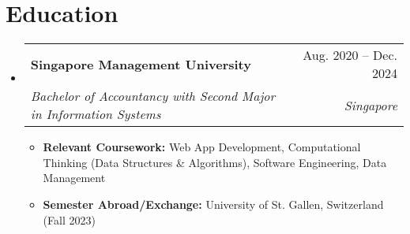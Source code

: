 \documentclass[letterpaper,11pt]{article}
\makeatletter
\newcommand{\resumeItem}[1]{
  \item\small{
    {#1 \vspace{-2pt}}
  }
}
\newcommand{\resumeSubheading}[4]{
  \vspace{-2pt}\item
    \begin{tabular*}{0.97\textwidth}[t]{l@{\extracolsep{\fill}}r}
      \textbf{#1} & #2 \\
      \textit{\small#3} & \textit{\small #4} \\
    \end{tabular*}\vspace{-7pt}
}
\newcommand{\resumeSubHeadingListStart}{\begin{itemize}[leftmargin=0.15in, label={}]}
\newcommand{\resumeSubHeadingListEnd}{\end{itemize}}
\newcommand{\resumeItemListStart}{\begin{itemize}}
\newcommand{\resumeItemListEnd}{\end{itemize}\vspace{-5pt}}
\makeatother
\begin{document}
\section{Education}
  \resumeSubHeadingListStart
    \resumeSubheading
      {Singapore Management University}{Aug. 2020 -- Dec. 2024}
      {Bachelor of Accountancy with Second Major in Information Systems}{Singapore}
      \resumeItemListStart
        \resumeItem{\textbf {Relevant Coursework:} Web App Development, Computational Thinking (Data Structures \& Algorithms), Software Engineering, Data Management}
        \resumeItem{\textbf {Semester Abroad/Exchange:} University of St. Gallen, Switzerland (Fall 2023)}
      \resumeItemListEnd
  \resumeSubHeadingListEnd


\end{document}
